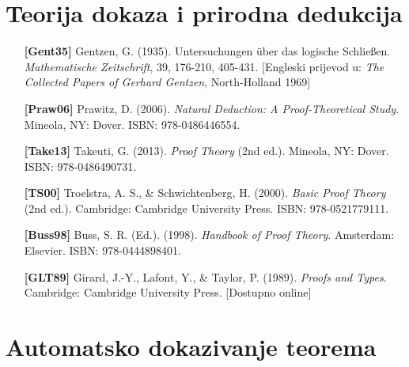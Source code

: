 \section{Teorija dokaza i prirodna dedukcija}

\begin{itemize}[leftmargin=2cm, labelsep=0.5cm, itemsep=0.3cm]

\item[\textbf{[Gent35]}] Gentzen, G. (1935). Untersuchungen über das logische Schließen. \textit{Mathematische Zeitschrift}, 39, 176-210, 405-431. [Engleski prijevod u: \textit{The Collected Papers of Gerhard Gentzen}, North-Holland 1969]

\item[\textbf{[Praw06]}] Prawitz, D. (2006). \textit{Natural Deduction: A Proof-Theoretical Study}. Mineola, NY: Dover. ISBN: 978-0486446554.

\item[\textbf{[Take13]}] Takeuti, G. (2013). \textit{Proof Theory} (2nd ed.). Mineola, NY: Dover. ISBN: 978-0486490731.

\item[\textbf{[TS00]}] Troelstra, A. S., \& Schwichtenberg, H. (2000). \textit{Basic Proof Theory} (2nd ed.). Cambridge: Cambridge University Press. ISBN: 978-0521779111.

\item[\textbf{[Buss98]}] Buss, S. R. (Ed.). (1998). \textit{Handbook of Proof Theory}. Amsterdam: Elsevier. ISBN: 978-0444898401.

\item[\textbf{[GLT89]}] Girard, J.-Y., Lafont, Y., \& Taylor, P. (1989). \textit{Proofs and Types}. Cambridge: Cambridge University Press. [Dostupno online]

\end{itemize}

\section{Automatsko dokazivanje teorema}

